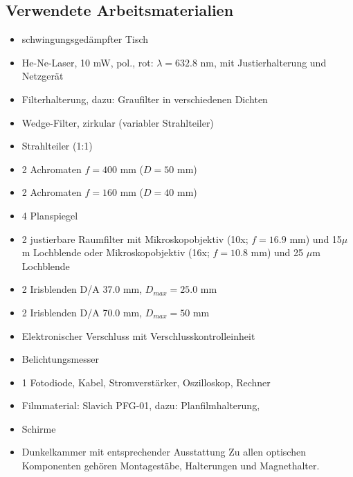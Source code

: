 \newpage
\subsection{Verwendete Arbeitsmaterialien}
\begin{itemize}
\item schwingungsgedämpfter Tisch 
\item He-Ne-Laser, 10 mW, pol., rot: $\lambda = 632.8$ nm, mit Justierhalterung und Netzgerät 
\item Filterhalterung, dazu: Graufilter in verschiedenen Dichten 
\item Wedge-Filter, zirkular (variabler Strahlteiler) 
\item Strahlteiler (1:1) 
\item 2 Achromaten $f = 400$ mm ($D = 50$ mm) 
\item 2 Achromaten $f = 160$ mm ($D = 40$ mm) 
\item 4 Planspiegel 
\item 2 justierbare Raumfilter mit Mikroskopobjektiv (10x; $f = 16.9$ mm) und 15$\mu$m Lochblende oder Mikroskopobjektiv (16x; $f = 10.8$ mm) und 25 $\mu$m Lochblende 
\item 2 Irisblenden D/A 37.0 mm, $D_{max} = 25.0$ mm 
\item 2 Irisblenden D/A 70.0 mm, $D_{max} = 50$ mm 
\item Elektronischer Verschluss mit Verschlusskontrolleinheit 
\item Belichtungsmesser 
\item 1 Fotodiode, Kabel, Stromverstärker, Oszilloskop, Rechner 
\item Filmmaterial: Slavich PFG-01, dazu: Planfilmhalterung, 
\item Schirme 
\item Dunkelkammer mit entsprechender Ausstattung 
Zu allen optischen Komponenten gehören Montagestäbe, Halterungen und Magnethalter. 
\end{itemize}
